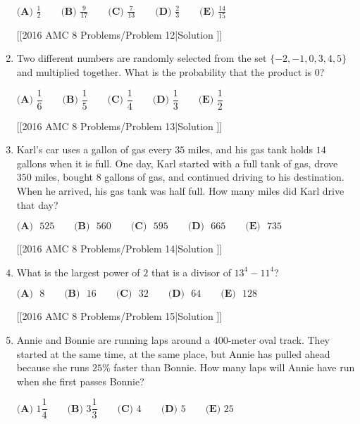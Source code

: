 \documentclass{article}
\begin{document}
\begin{enumerate}[label=\arabic*., itemsep=0.5em]
\(\textbf{(A) }\frac{1}{2}\qquad\textbf{(B) }\frac{9}{17}\qquad\textbf{(C) }\frac{7}{13}\qquad\textbf{(D) }\frac{2}{3}\qquad \textbf{(E) }\frac{14}{15}\)

[[2016 AMC 8 Problems/Problem 12|Solution
]]\par \vspace{0.5em}\item Two different numbers are randomly selected from the set \(\{ - 2, -1, 0, 3, 4, 5\}\) and multiplied together. What is the probability that the product is \(0\)?

\(\textbf{(A) }\dfrac{1}{6}\qquad\textbf{(B) }\dfrac{1}{5}\qquad\textbf{(C) }\dfrac{1}{4}\qquad\textbf{(D) }\dfrac{1}{3}\qquad \textbf{(E) }\dfrac{1}{2}\)

[[2016 AMC 8 Problems/Problem 13|Solution
]]\par \vspace{0.5em}\item Karl's car uses a gallon of gas every \(35\) miles, and his gas tank holds \(14\) gallons when it is full. One day, Karl started with a full tank of gas, 
drove \(350\) miles, bought \(8\) gallons of gas, and continued driving to his destination. When he arrived, his gas tank was half full. How many miles did Karl drive that day? 

\(\textbf{(A)}\mbox{ }525\qquad\textbf{(B)}\mbox{ }560\qquad\textbf{(C)}\mbox{ }595\qquad\textbf{(D)}\mbox{ }665\qquad\textbf{(E)}\mbox{ }735\)

[[2016 AMC 8 Problems/Problem 14|Solution
]]\par \vspace{0.5em}\item What is the largest power of \(2\) that is a divisor of \(13^4 - 11^4\)?

\(\textbf{(A)}\mbox{ }8\qquad \textbf{(B)}\mbox{ }16\qquad \textbf{(C)}\mbox{ }32\qquad \textbf{(D)}\mbox{ }64\qquad \textbf{(E)}\mbox{ }128\)

[[2016 AMC 8 Problems/Problem 15|Solution
]]\par \vspace{0.5em}\item Annie and Bonnie are running laps around a \(400\)-meter oval track. They started at the same time, at the same place, but Annie has pulled ahead because she runs \(25\%\) faster than Bonnie. How many laps will Annie have run when she first passes Bonnie?

\(\textbf{(A) }1\dfrac{1}{4}\qquad\textbf{(B) }3\dfrac{1}{3}\qquad\textbf{(C) }4\qquad\textbf{(D) }5\qquad \textbf{(E) }25\)


\end{enumerate}
\end{document}
